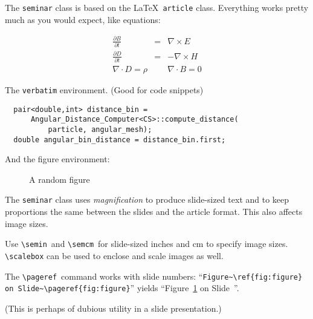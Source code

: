 \documentclass[SRD,
               slidesonly,
                notes
              ]{CCS4seminar}
\begin{document}
\begin{slide}
  
  The {\tt seminar} class is based on the \LaTeX\ {\tt article} class.
  Everything works pretty much as you would expect, like equations:

\begin{eqnarray}
  \frac{\partial B}{\partial t} & = & \nabla\times E \nonumber \\
  \frac{\partial D}{\partial t} & = & -\nabla\times H
  \label{eqn:maxwell} \\
  \nabla\cdot D = \rho & & \nabla\cdot B = 0 \nonumber
\end{eqnarray}

The {\tt verbatim} environment. (Good for code snippets)
\begin{verbatim}
  pair<double,int> distance_bin = 
      Angular_Distance_Computer<CS>::compute_distance(
          particle, angular_mesh);
  double angular_bin_distance = distance_bin.first;
\end{verbatim}

\end{slide}

\begin{slide}


And the figure environment:

\begin{figure}
  \begin{center}
    \scalebox{0.7}{}
  \end{center}
  \caption{A random figure}
  \label{fig:figure}
\end{figure}

\end{slide}

\begin{slide}


  The {\tt seminar} class uses {\em magnification} to produce
  slide-sized text and to keep proportions the same between the slides
  and the article format. This also affects image sizes.
  
  Use \verb=\semin=\ and \verb=\semcm=\ for slide-sized inches and cm
  to specify image sizes.  \verb=\scalebox= can be used to enclose and
  scale images as well.


  The \verb=\pageref=\ command works with slide numbers:
  ``\verb=Figure~\ref{fig:figure} on Slide~\pageref{fig:figure}=''
  yields ``Figure~\ref{fig:figure} on Slide~\pageref{fig:figure}''.

  (This is perhaps of dubious utility in a slide presentation.)
  
\end{slide}
\end{document}
